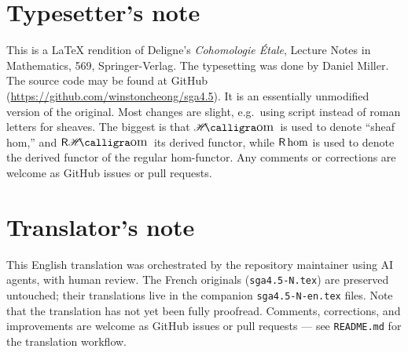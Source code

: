 
\section*{Typesetter's note}

This is a \LaTeX{} rendition of Deligne's \emph{Cohomologie \'Etale}, Lecture
Notes in Mathematics, 569, Springer-Verlag. The
typesetting was done by Daniel Miller. The source code may be found at
GitHub (\url{https://github.com/winstoncheong/sga4.5}). It is an essentially
unmodified version of the original. Most changes are slight, e.g.\ using
script instead of roman letters for sheaves. The biggest is that
$\Hom$ is used to denote ``sheaf hom,'' and $\rHom$ its derived functor, while
$\operatorname{\mathsf{R}\hom}$ is used to denote the derived functor of the regular hom-functor. Any
comments or corrections are welcome as GitHub issues or pull requests.

\section*{Translator's note}

This English translation was orchestrated by the repository maintainer
using AI agents, with human review. The French originals
(\texttt{sga4.5-N.tex}) are preserved untouched; their translations live in
the companion \texttt{sga4.5-N-en.tex} files. Note that the translation has
not yet been fully proofread. Comments, corrections, and improvements are
welcome as GitHub issues or pull requests --- see
\texttt{README.md} for the translation workflow.

